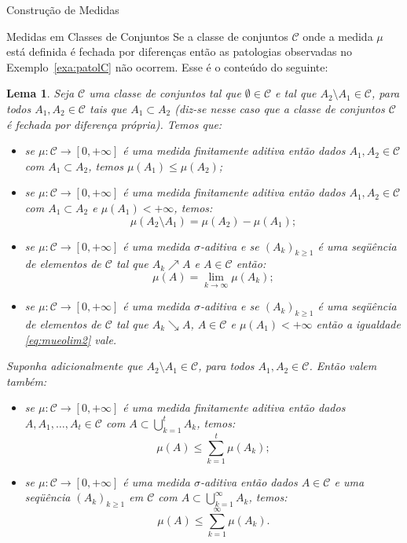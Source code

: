 \documentclass[oneside,final,11pt]{amsbook}
\theoremstyle{remark}\newtheorem{exercise}{Exercício}[chapter]
\theoremstyle{remark}\newtheorem{*exercise}[exercise]{\hbox to 0pt{\hskip 0pt minus 1fil*}Exercício}
\theoremstyle{definition}\newtheorem{exdefin}{Definição}[chapter]
\theoremstyle{plain}\newtheorem{teo}{Teorema}[section]
\theoremstyle{plain}\newtheorem{lem}[teo]{Lema}
\theoremstyle{plain}\newtheorem{prop}[teo]{Proposição}
\theoremstyle{plain}\newtheorem{cor}[teo]{Corolário}
\theoremstyle{definition}\newtheorem{defin}[teo]{Definição}
\theoremstyle{remark}\newtheorem{rem}[teo]{Observação}
\theoremstyle{definition}\newtheorem{notation}[teo]{Notação}
\theoremstyle{definition}\newtheorem{convention}[teo]{Convenção}
\theoremstyle{definition}\newtheorem{example}[teo]{Exemplo}
\numberwithin{section}{chapter}
\numberwithin{equation}{section}
\begin{document}
\begin{chapter}{Construção de Medidas}
\begin{section}{Medidas em Classes de Conjuntos}
Se a classe de conjuntos $\mathcal C$ onde a medida $\mu$ está definida é fechada por diferenças então as patologias
observadas no Exemplo~\ref{exa:patolC} não ocorrem. Esse é o conteúdo do seguinte:
\begin{lem}\label{thm:classerazoavel}
Seja $\mathcal C$ uma classe de conjuntos tal que $\emptyset\in\mathcal C$ e tal que $A_2\setminus A_1\in\mathcal C$,
para todos $A_1,A_2\in\mathcal C$ tais que $A_1\subset A_2$ (diz-se nesse caso que a classe de conjuntos $\mathcal C$ é
{\em fechada por diferença própria}). Temos que:
\begin{itemize}
\item[(a)] se $\mu:\mathcal C\to[0,+\infty]$ é uma medida finitamente aditiva então dados $A_1,A_2\in\mathcal C$ com
$A_1\subset A_2$, temos $\mu(A_1)\le\mu(A_2)$;
\item[(b)] se $\mu:\mathcal C\to[0,+\infty]$ é uma medida finitamente aditiva então dados $A_1,A_2\in\mathcal C$ com
$A_1\subset A_2$ e $\mu(A_1)<+\infty$, temos:
\[\mu(A_2\setminus A_1)=\mu(A_2)-\mu(A_1);\]
\item[(c)] se $\mu:\mathcal C\to[0,+\infty]$ é uma medida $\sigma$-aditiva e se $(A_k)_{k\ge1}$ é uma seqüência
de elementos de $\mathcal C$ tal que $A_k\nearrow A$ e $A\in\mathcal C$ então:
\begin{equation}\label{eq:mueolim2}
\mu(A)=\lim_{k\to\infty}\mu(A_k);
\end{equation}
\item[(d)] se $\mu:\mathcal C\to[0,+\infty]$ é uma medida $\sigma$-aditiva e se $(A_k)_{k\ge1}$ é uma seqüência
de elementos de $\mathcal C$ tal que $A_k\searrow A$, $A\in\mathcal C$ e $\mu(A_1)<+\infty$ então a igualdade \eqref{eq:mueolim2}
vale.
\end{itemize}
Suponha adicionalmente que $A_2\setminus A_1\in\mathcal C$, para todos $A_1,A_2\in\mathcal C$. Então valem também:
\begin{itemize}
\item[(e)] se $\mu:\mathcal C\to[0,+\infty]$ é uma medida finitamente aditiva então dados $A,A_1,\ldots,A_t\in\mathcal C$
com $A\subset\bigcup_{k=1}^tA_k$, temos:
\[\mu(A)\le\sum_{k=1}^t\mu(A_k);\]
\item[(f)] se $\mu:\mathcal C\to[0,+\infty]$ é uma medida $\sigma$-aditiva então dados $A\in\mathcal C$ e uma seqüência
$(A_k)_{k\ge1}$ em $\mathcal C$ com $A\subset\bigcup_{k=1}^\infty A_k$, temos:
\[\mu(A)\le\sum_{k=1}^\infty\mu(A_k).\]
\end{itemize}

\end{lem}
\end{section}
\end{chapter}
\end{document}
